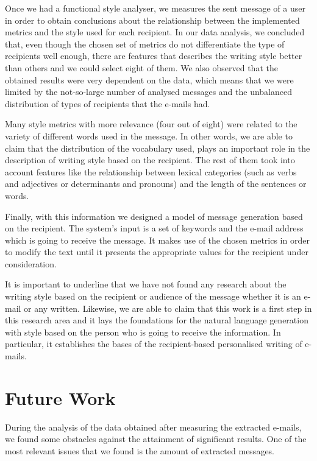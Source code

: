 Once we had a functional style analyser, we measures the sent message of a user in order to obtain conclusions about the relationship between the implemented metrics and the style used for each recipient. In our data analysis, we concluded that, even though the chosen set of metrics do not differentiate the type of recipients well enough, there are features that describes the writing style better than others and we could select eight of them. We also observed that the obtained results were very dependent on the data, which means that we were limited by the not-so-large number of analysed messages and the unbalanced distribution of types of recipients that the e-mails had.

Many style metrics with more relevance (four out of eight) were related to the variety of different words used in the message. In other words, we are able to claim that the distribution of the vocabulary used, plays an important role in the description of writing style based on the recipient. The rest of them took into account features like the relationship between lexical categories (such as verbs and adjectives or determinants and pronouns) and the length of the sentences or words.

Finally, with this information we designed a model of message generation based on the recipient. The system's input is a set of keywords and the e-mail address which is going to receive the message. It makes use of the chosen metrics in order to modify the text until it presents the appropriate values for the recipient under consideration.

It is important to underline that we have not found any research about the writing style based on the recipient or audience of the message whether it is an e-mail or any written. Likewise, we are able to claim that this work is a first step in this research area and it lays the foundations for the natural language generation with style based on the person who is going to receive the information. In particular, it establishes the bases of the recipient-based personalised writing of e-mails.

\section{Future Work}\label{sect:future}
During the analysis of the data obtained after measuring the extracted e-mails, we found some obstacles against the attainment of significant results. One of the most relevant issues that we found is the amount of extracted messages.